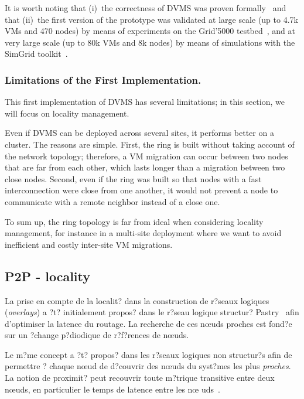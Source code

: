 It is worth noting that (i)~the correctness of DVMS was proven
formally~\cite{quesnel:ispa13} and that (ii)~the first version of the prototype
was validated at large scale (up to 4.7k VMs and 470 nodes) by means of experiments on the Grid'5000
testbed~\cite{quesnel:ispa13},
and at very large scale (up to 80k VMs and 8k nodes) by means of simulations
with the SimGrid toolkit~\cite{Casanova:2008:SGF:1397760.1398183}.

\subsubsection{Limitations of the First Implementation.}

This first implementation of DVMS has several limitations; in this section, we
will focus on locality management.

Even if DVMS can be deployed across several sites, it performs better on a
cluster.
%
The reasons are simple.
%
First, the ring is built without taking account of the network topology;
therefore, a VM migration can occur between two nodes that are far from each
other, which lasts longer than a migration between two close nodes.
%
Second, even if the ring was built so that nodes with a fast interconnection
were close from one another, it would not prevent a node to communicate with 
a remote neighbor instead of a close one.

To sum up, the ring topology is far from ideal when considering locality
management, for instance in a multi-site deployment where we want to avoid
inefficient and costly inter-site VM migrations.




\subsection{P2P - locality}


La prise en compte de la localit? dans la construction de r?seaux logiques
(\emph{overlays}) a ?t? initialement propos? dans le r?seau logique structur?
Pastry~\cite{pastry} afin d'optimiser la latence du routage. La recherche de ces
n\oe uds proches est fond?e sur un ?change p?diodique de r?f?rences de n\oe uds.

Le m?me concept a ?t? propos? dans les r?seaux logiques non structur?s afin de
permettre ? chaque n\oe ud de d?couvrir des n\oe uds du syst?mes les plus
\emph{proches}. La notion de proximit? peut recouvrir toute m?trique transitive
entre deux n\oe uds, en particulier le temps de latence entre les n\oe
uds~\cite{refquivabienmarindoittrouver}.

